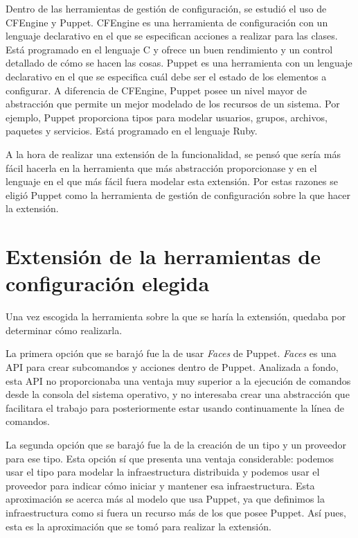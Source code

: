 Dentro de las herramientas de gestión de configuración, se estudió el uso de CFEngine y Puppet. CFEngine es una herramienta de configuración con un lenguaje declarativo en el que se especifican acciones a realizar para las clases. Está programado en el lenguaje C y ofrece un buen rendimiento y un control detallado de cómo se hacen las cosas. Puppet es una herramienta con un lenguaje declarativo en el que se especifica cuál debe ser el estado de los elementos a configurar. A diferencia de CFEngine, Puppet posee un nivel mayor de abstracción que permite un mejor modelado de los recursos de un sistema. Por ejemplo, Puppet proporciona tipos para modelar usuarios, grupos, archivos, paquetes y servicios. Está programado en el lenguaje Ruby.

A la hora de realizar una extensión de la funcionalidad, se pensó que sería más fácil hacerla en la herramienta que más abstracción proporcionase y en el lenguaje en el que más fácil fuera modelar esta extensión. Por estas razones se eligió Puppet como la herramienta de gestión de configuración sobre la que hacer la extensión.


\section{Extensión de la herramientas de configuración elegida}

Una vez escogida la herramienta sobre la que se haría la extensión, quedaba por determinar cómo realizarla.

La primera opción que se barajó fue la de usar \emph{Faces} de Puppet. \emph{Faces} es una API para crear subcomandos y acciones dentro de Puppet. Analizada a fondo, esta API no proporcionaba una ventaja muy superior a la ejecución de comandos desde la consola del sistema operativo, y no interesaba crear una abstracción que facilitara el trabajo para posteriormente estar usando continuamente la línea de comandos.

La segunda opción que se barajó fue la de la creación de un tipo y un proveedor para ese tipo. Esta opción sí que presenta una ventaja considerable: podemos usar el tipo para modelar la infraestructura distribuida y podemos usar el proveedor para indicar cómo iniciar y mantener esa infraestructura. Esta aproximación se acerca más al modelo que usa Puppet, ya que definimos la infraestructura como si fuera un recurso más de los que posee Puppet. Así pues, esta es la aproximación que se tomó para realizar la extensión.
